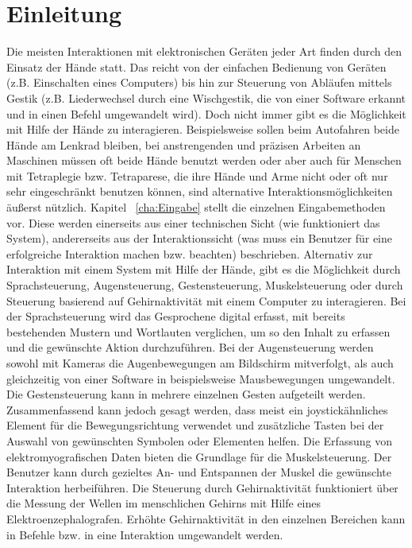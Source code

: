 \chapter{Einleitung}
\label{cha:Einleitung}

Die meisten Interaktionen mit elektronischen Geräten jeder Art finden durch den Einsatz der Hände statt. Das reicht von der einfachen Bedienung von Geräten (z.B. Einschalten eines Computers) bis hin zur Steuerung von Abläufen mittels Gestik (z.B. Liederwechsel durch eine Wischgestik, die von einer Software erkannt und in einen Befehl umgewandelt wird). Doch nicht immer gibt es die Möglichkeit mit Hilfe der Hände zu interagieren. Beispielsweise sollen beim Autofahren beide Hände am Lenkrad bleiben, bei anstrengenden und präzisen Arbeiten an Maschinen müssen oft beide Hände benutzt werden oder aber auch für Menschen mit Tetraplegie bzw. Tetraparese, die ihre Hände und Arme nicht oder oft nur sehr eingeschränkt benutzen können, sind alternative Interaktionsmöglichkeiten äußerst nützlich.
\newline \newline
Kapitel ~\ref{cha:Eingabe} stellt die einzelnen Eingabemethoden vor. Diese werden einerseits aus einer technischen Sicht (wie funktioniert das System), andererseits aus der Interaktionssicht (was muss ein Benutzer für eine erfolgreiche Interaktion machen bzw. beachten) beschrieben. Alternativ zur Interaktion mit einem System mit Hilfe der Hände, gibt es die Möglichkeit durch Sprachsteuerung, Augensteuerung, Gestensteuerung, Muskelsteuerung oder durch Steuerung basierend auf Gehirnaktivität mit einem Computer zu interagieren. Bei der Sprachsteuerung wird das Gesprochene digital erfasst, mit bereits bestehenden Mustern und Wortlauten verglichen, um so den Inhalt zu erfassen und die gewünschte Aktion durchzuführen. Bei der Augensteuerung werden sowohl mit Kameras die Augenbewegungen am Bildschirm mitverfolgt, als auch gleichzeitig von einer Software in beispielsweise Mausbewegungen umgewandelt. Die Gestensteuerung kann in mehrere einzelnen Gesten aufgeteilt werden. Zusammenfassend kann jedoch gesagt werden, dass meist ein joystickähnliches Element für die Bewegungsrichtung verwendet und zusätzliche Tasten bei der Auswahl von gewünschten Symbolen oder Elementen helfen. Die Erfassung von elektromyografischen Daten bieten die Grundlage für die Muskelsteuerung. Der Benutzer kann durch gezieltes An- und Entspannen der Muskel die gewünschte Interaktion herbeiführen. Die Steuerung durch Gehirnaktivität funktioniert über die Messung der Wellen im menschlichen Gehirns mit Hilfe eines  Elektroenzephalografen. Erhöhte Gehirnaktivität in den einzelnen Bereichen kann in Befehle bzw. in eine Interaktion umgewandelt werden.
